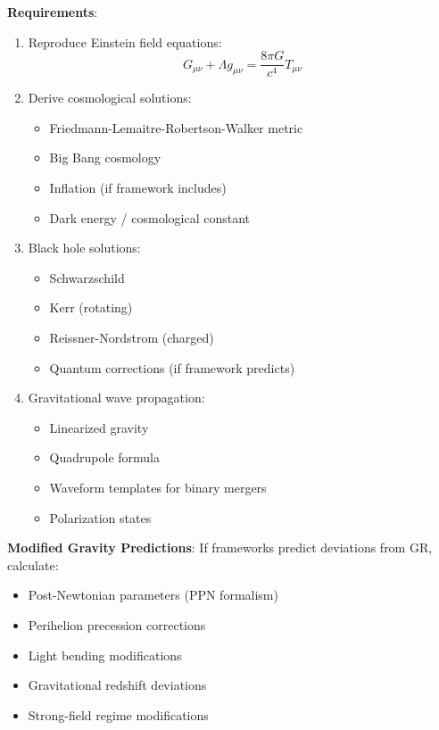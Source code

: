 \textbf{Requirements}:
\begin{enumerate}
    \item Reproduce Einstein field equations:
    \begin{equation}
    G_{\mu\nu} + \Lambda g_{\mu\nu} = \frac{8\pi G}{c^4} T_{\mu\nu}
    \end{equation}

    \item Derive cosmological solutions:
    \begin{itemize}
        \item Friedmann-Lemaitre-Robertson-Walker metric
        \item Big Bang cosmology
        \item Inflation (if framework includes)
        \item Dark energy / cosmological constant
    \end{itemize}

    \item Black hole solutions:
    \begin{itemize}
        \item Schwarzschild
        \item Kerr (rotating)
        \item Reissner-Nordstrom (charged)
        \item Quantum corrections (if framework predicts)
    \end{itemize}

    \item Gravitational wave propagation:
    \begin{itemize}
        \item Linearized gravity
        \item Quadrupole formula
        \item Waveform templates for binary mergers
        \item Polarization states
    \end{itemize}
\end{enumerate}

\textbf{Modified Gravity Predictions}:
If frameworks predict deviations from GR, calculate:
\begin{itemize}
    \item Post-Newtonian parameters (PPN formalism)
    \item Perihelion precession corrections
    \item Light bending modifications
    \item Gravitational redshift deviations
    \item Strong-field regime modifications
\end{itemize}

